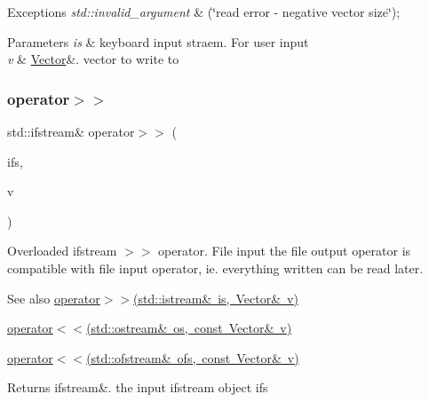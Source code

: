 \begin{DoxyExceptions}{Exceptions}
{\em std\+::invalid\+\_\+argument} & (\char`\"{}read error -\/ negative vector size\char`\"{}); \\
\hline
\end{DoxyExceptions}

\begin{DoxyParams}{Parameters}
{\em is} & keyboard input straem. For user input \\
\hline
{\em v} & \mbox{\hyperlink{classVector}{Vector}}\&. vector to write to \\
\hline
\end{DoxyParams}
\mbox{\label{classVector_ab6009b37fac65598b3db164dc4f19fed}} 
\subsubsection{\texorpdfstring{operator$>$$>$}{operator>>}\hspace{0.1cm}{\footnotesize\ttfamily [2/2]}}
{\footnotesize\ttfamily std\+::ifstream\& operator$>$$>$ (\begin{DoxyParamCaption}\item[{std\+::ifstream \&}]{ifs,  }\item[{\mbox{\hyperlink{classVector}{Vector}} \&}]{v }\end{DoxyParamCaption})\hspace{0.3cm}{\ttfamily [friend]}}

Overloaded ifstream $>$$>$ operator. File input the file output operator is compatible with file input operator, ie. everything written can be read later. \begin{DoxySeeAlso}{See also}
\mbox{\hyperlink{classVector_ac198cff0f4196c66649278458eebf227}{operator$>$$>$(std\+::istream\& is, Vector\& v)}} 

\mbox{\hyperlink{classVector_ac254b27efeb8486ee2f67821e3a21a60}{operator$<$$<$(std\+::ostream\& os, const Vector\& v)}} 

\mbox{\hyperlink{classVector_a8e755f5550c983df730602890058d990}{operator$<$$<$(std\+::ofstream\& ofs, const Vector\& v)}} 
\end{DoxySeeAlso}
\begin{DoxyReturn}{Returns}
ifstream\&. the input ifstream object ifs 
\end{DoxyReturn}

